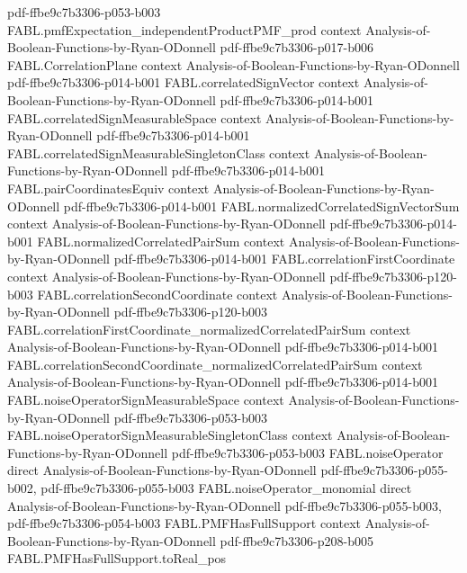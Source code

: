 \begin{theorem}
  {pdf-ffbe9c7b3306-p053-b003}
\proofstep
  {FABL.pmfExpectation_independentProductPMF_prod}
  {context}
  {Analysis-of-Boolean-Functions-by-Ryan-ODonnell}
  {pdf-ffbe9c7b3306-p017-b006}
\proofstep
  {FABL.CorrelationPlane}
  {context}
  {Analysis-of-Boolean-Functions-by-Ryan-ODonnell}
  {pdf-ffbe9c7b3306-p014-b001}
\proofstep
  {FABL.correlatedSignVector}
  {context}
  {Analysis-of-Boolean-Functions-by-Ryan-ODonnell}
  {pdf-ffbe9c7b3306-p014-b001}
\proofstep
  {FABL.correlatedSignMeasurableSpace}
  {context}
  {Analysis-of-Boolean-Functions-by-Ryan-ODonnell}
  {pdf-ffbe9c7b3306-p014-b001}
\proofstep
  {FABL.correlatedSignMeasurableSingletonClass}
  {context}
  {Analysis-of-Boolean-Functions-by-Ryan-ODonnell}
  {pdf-ffbe9c7b3306-p014-b001}
\proofstep
  {FABL.pairCoordinatesEquiv}
  {context}
  {Analysis-of-Boolean-Functions-by-Ryan-ODonnell}
  {pdf-ffbe9c7b3306-p014-b001}
\proofstep
  {FABL.normalizedCorrelatedSignVectorSum}
  {context}
  {Analysis-of-Boolean-Functions-by-Ryan-ODonnell}
  {pdf-ffbe9c7b3306-p014-b001}
\proofstep
  {FABL.normalizedCorrelatedPairSum}
  {context}
  {Analysis-of-Boolean-Functions-by-Ryan-ODonnell}
  {pdf-ffbe9c7b3306-p014-b001}
\proofstep
  {FABL.correlationFirstCoordinate}
  {context}
  {Analysis-of-Boolean-Functions-by-Ryan-ODonnell}
  {pdf-ffbe9c7b3306-p120-b003}
\proofstep
  {FABL.correlationSecondCoordinate}
  {context}
  {Analysis-of-Boolean-Functions-by-Ryan-ODonnell}
  {pdf-ffbe9c7b3306-p120-b003}
\proofstep
  {FABL.correlationFirstCoordinate_normalizedCorrelatedPairSum}
  {context}
  {Analysis-of-Boolean-Functions-by-Ryan-ODonnell}
  {pdf-ffbe9c7b3306-p014-b001}
\proofstep
  {FABL.correlationSecondCoordinate_normalizedCorrelatedPairSum}
  {context}
  {Analysis-of-Boolean-Functions-by-Ryan-ODonnell}
  {pdf-ffbe9c7b3306-p014-b001}
\proofstep
  {FABL.noiseOperatorSignMeasurableSpace}
  {context}
  {Analysis-of-Boolean-Functions-by-Ryan-ODonnell}
  {pdf-ffbe9c7b3306-p053-b003}
\proofstep
  {FABL.noiseOperatorSignMeasurableSingletonClass}
  {context}
  {Analysis-of-Boolean-Functions-by-Ryan-ODonnell}
  {pdf-ffbe9c7b3306-p053-b003}
\proofstep
  {FABL.noiseOperator}
  {direct}
  {Analysis-of-Boolean-Functions-by-Ryan-ODonnell}
  {pdf-ffbe9c7b3306-p055-b002,
    pdf-ffbe9c7b3306-p055-b003}
\proofstep
  {FABL.noiseOperator_monomial}
  {direct}
  {Analysis-of-Boolean-Functions-by-Ryan-ODonnell}
  {pdf-ffbe9c7b3306-p055-b003,
    pdf-ffbe9c7b3306-p054-b003}
\proofstep
  {FABL.PMFHasFullSupport}
  {context}
  {Analysis-of-Boolean-Functions-by-Ryan-ODonnell}
  {pdf-ffbe9c7b3306-p208-b005}
\proofstep
  {FABL.PMFHasFullSupport.toReal_pos}

\end{theorem}
